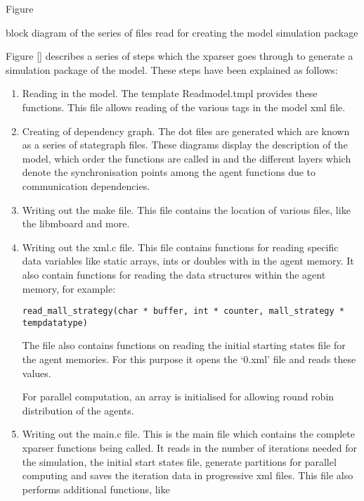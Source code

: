 Figure \caption{block diagram of the series of files read for creating the model simulation package}

Figure \ref{} describes a series of steps which the xparser goes through to generate a simulation package of the model. These steps have been explained as follows:
\begin{enumerate}
\item Reading in the model. The template Readmodel.tmpl provides these functions. This file allows reading of the various tags in the model xml file.
\item Creating of dependency graph. The dot files are generated which are known as a series of stategraph files. These diagrams display the description of the model, which order the functions are called in and the different layers which denote the synchronisation points among the agent functions due to communication dependencies.
\item Writing out the make file. This file contains the location of various files, like the libmboard and more.
\item Writing out the xml.c file. This file contains functions for reading specific data variables like static arrays, ints or doubles with in the agent memory. It also contain functions for reading the data structures within the agent memory, for example:

\begin{mylisting}
\begin{verbatim}
read_mall_strategy(char * buffer, int * counter, mall_strategy * tempdatatype)
\end{verbatim}
\end{mylisting}

The file also contains functions on reading the initial starting states file for the agent memories. For this purpose it opens the `0.xml' file and reads these values.

For parallel computation, an array is initialised for allowing round robin distribution of the agents.

\item Writing out the main.c file. This is the main file which contains the complete xparser functions being called. It reads in the number of iterations needed for the simulation, the initial start states file, generate partitions for parallel computing and saves the iteration data in progressive xml files. This file also performs additional functions, like


\end{enumerate}
